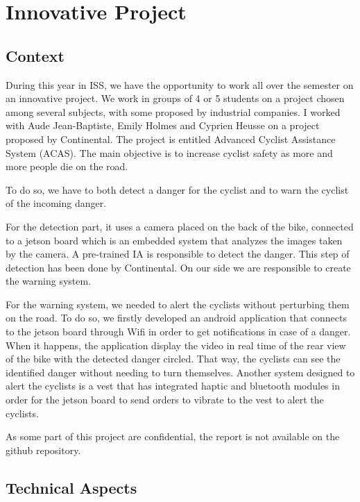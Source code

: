 \section{Innovative Project}

\subsection{Context}

During this year in ISS, we have the opportunity to work all over the semester on an innovative project. We work in groups of 4 or 5 students on a project chosen among several subjects, with some proposed by industrial companies. I worked with Aude Jean-Baptiste, Emily Holmes and Cyprien Heusse on a project proposed by Continental. The project is entitled Advanced Cyclist Assistance System (ACAS). The main objective is to increase cyclist safety as more and more people die on the road. \par
To do so, we have to both detect a danger for the cyclist and to warn the cyclist of the incoming danger.
\\\par
For the detection part, it uses a camera placed on the back of the bike, connected to a jetson board which is an embedded system that analyzes the images taken by the camera. A pre-trained IA is responsible to detect the danger. This step of detection has been done by Continental. On our side we are responsible to create the warning system.
\\\par
For the warning system, we needed to alert the cyclists without perturbing them on the road. To do so, we firstly developed an android application that connects to the jetson board through Wifi in order to get notifications in case of a danger. When it happens, the application display the video in real time of the rear view of the bike with the detected danger circled. That way, the cyclists can see the identified danger without needing to turn themselves. Another system designed to alert the cyclists is a vest that has integrated haptic and bluetooth modules in order for the jetson board to send orders to vibrate to the vest to alert the cyclists.
\\\par

As some part of this project are confidential, the report is not available on the github repository.

\subsection{Technical Aspects}

